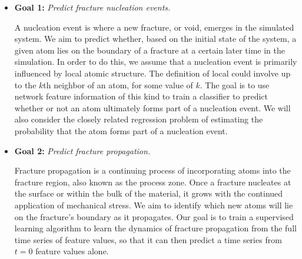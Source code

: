 \begin{itemize}
\item \textbf{Goal 1:} \emph{Predict fracture nucleation events.} 

A nucleation event is where a new fracture, or void, emerges in the simulated system.  We aim to predict whether, based on the initial state of the system, a given atom lies on the boundary of a fracture at a certain later time in the simulation.  In order to do this, we assume that a nucleation event is primarily influenced by local atomic structure.  The definition of local could involve up to the $k$th neighbor of an atom, for some value of $k$.  The goal is to use network feature information of this kind to train a classifier to predict whether or not an atom ultimately forms part of a nucleation event.  We will also consider the closely related regression problem of estimating the probability that the atom forms part of a nucleation event.


\item \textbf{Goal 2:} \emph{Predict fracture propagation.} 

Fracture propagation is a continuing process of incorporating atoms into the fracture region, also known as the process zone.
Once a fracture nucleates at the surface or within the bulk of the material, it grows with the continued application of mechanical stress.  We aim to identify which new atoms will lie on the fracture's boundary as it propagates.  Our goal is to train a supervised learning algorithm to learn the dynamics of fracture propagation from the full time series of feature values, so that it can then predict a time series from $t=0$ feature values alone.


\end{itemize}

